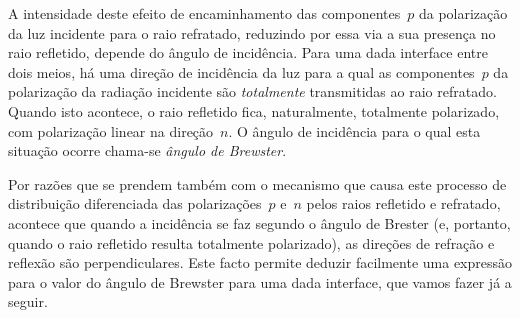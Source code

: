 A intensidade deste efeito de encaminhamento das componentes~$p$ da polarização
da luz incidente para o raio refratado, reduzindo por essa via a sua presença no
raio refletido, depende do ângulo de incidência. Para uma dada interface entre
dois meios, há uma direção de incidência da luz para a qual as componentes~$p$
da polarização da radiação incidente são \emph{totalmente} transmitidas ao raio
refratado. Quando isto acontece, o raio refletido fica, naturalmente, totalmente
polarizado, com polarização linear na direção~$n$. O ângulo de incidência para o
qual esta situação ocorre chama-se \emph{ângulo de Brewster}. 

Por razões que se prendem também com o mecanismo que causa este processo
de distribuição diferenciada das polarizações~$p$ e~$n$ pelos raios refletido e
refratado, acontece que quando a incidência se faz segundo o ângulo de Brester
(e, portanto, quando o raio refletido resulta totalmente polarizado), as
direções de refração e reflexão são perpendiculares. Este facto permite deduzir
facilmente uma expressão para o valor do ângulo de Brewster para uma dada
interface, que vamos fazer já a seguir.

